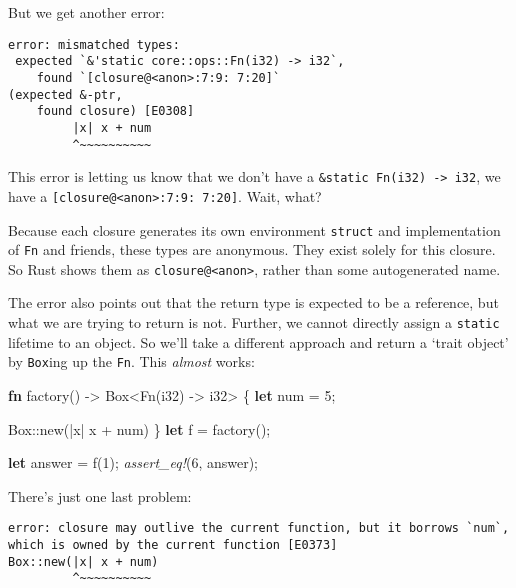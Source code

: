 \documentclass[a4paper,]{book}
\newenvironment{Shaded}{\begin{snugshade}}{\end{snugshade}}
\newcommand{\KeywordTok}[1]{\textcolor[rgb]{0.13,0.29,0.53}{\textbf{{#1}}}}
\newcommand{\DataTypeTok}[1]{\textcolor[rgb]{0.13,0.29,0.53}{{#1}}}
\newcommand{\DecValTok}[1]{\textcolor[rgb]{0.00,0.00,0.81}{{#1}}}
\newcommand{\BuiltInTok}[1]{{#1}}
\newcommand{\PreprocessorTok}[1]{\textcolor[rgb]{0.56,0.35,0.01}{\textit{{#1}}}}
\newcommand{\NormalTok}[1]{{#1}}
\begin{document}
But we get another error:

\begin{verbatim}
error: mismatched types:
 expected `&'static core::ops::Fn(i32) -> i32`,
    found `[closure@<anon>:7:9: 7:20]`
(expected &-ptr,
    found closure) [E0308]
         |x| x + num
         ^~~~~~~~~~~
\end{verbatim}

This error is letting us know that we don't have a
\texttt{\&\textquotesingle{}static\ Fn(i32)\ -\textgreater{}\ i32}, we
have a \texttt{{[}closure@\textless{}anon\textgreater{}:7:9:\ 7:20{]}}.
Wait, what?

Because each closure generates its own environment \texttt{struct} and
implementation of \texttt{Fn} and friends, these types are anonymous.
They exist solely for this closure. So Rust shows them as
\texttt{closure@\textless{}anon\textgreater{}}, rather than some
autogenerated name.

The error also points out that the return type is expected to be a
reference, but what we are trying to return is not. Further, we cannot
directly assign a \texttt{\textquotesingle{}static} lifetime to an
object. So we'll take a different approach and return a `trait object'
by \texttt{Box}ing up the \texttt{Fn}. This \emph{almost} works:

\begin{Shaded}
\begin{Highlighting}[]
\KeywordTok{fn} \NormalTok{factory() -> }\DataTypeTok{Box}\NormalTok{<}\BuiltInTok{Fn}\NormalTok{(}\DataTypeTok{i32}\NormalTok{) -> }\DataTypeTok{i32}\NormalTok{> \{}
    \KeywordTok{let} \NormalTok{num = }\DecValTok{5}\NormalTok{;}

    \DataTypeTok{Box}\NormalTok{::new(|x| x + num)}
\NormalTok{\}}
\KeywordTok{let} \NormalTok{f = factory();}

\KeywordTok{let} \NormalTok{answer = f(}\DecValTok{1}\NormalTok{);}
\PreprocessorTok{assert_eq!}\NormalTok{(}\DecValTok{6}\NormalTok{, answer);}
\end{Highlighting}
\end{Shaded}

There's just one last problem:

\begin{verbatim}
error: closure may outlive the current function, but it borrows `num`,
which is owned by the current function [E0373]
Box::new(|x| x + num)
         ^~~~~~~~~~~
\end{verbatim}
\end{document}
